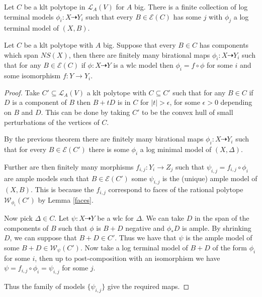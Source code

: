 	\begin{theorem}\cite[Theorem 9.34]{bhatt2020globally+}
		Let $C$ be a klt polytope in $\mathcal{L}_{A}(V)$ for $A$ big. There is a finite collection of log terminal models $\phi_{i}: X \dashrightarrow Y_{i}$ such that  every $B \in \mathcal{E}(C)$ has some $j$ with $\phi_{j}$ a log terminal model of $(X,B)$. 
	\end{theorem}
	

	
	\begin{corollary}\label{klt_finiteness}
		Let $C$ be a klt polytope with $A$ big. Suppose that every $B \in C$ has components which span $NS(X)$, then there are finitely many birational maps $\phi_{i}: X \dashrightarrow Y_{i}$ such that for any $B \in \mathcal{E}(C)$ if $\phi: X \dashrightarrow Y$ is a wlc model then $\phi_{i}=f \circ \phi$ for some $i$ and some isomorphism $f: Y \to Y_{i}$.
	\end{corollary}
	
	\begin{proof}
		
		Take $C'\subseteq \mathcal{L}_{A}(V)$ a klt polytope with $C \subseteq C'$ such that for any $B \in C$ if $D$ is a component of $B$ then $B+tD$ is in $C$ for $|t| > \epsilon$, for some $\epsilon >0$ depending on $B$ and $D$. This can be done by taking $C'$ to be the convex hull of small perturbations of the vertices of $C$.
		
		By the previous theorem there are finitely many birational maps $\phi_{i}: X \dashrightarrow Y_{i}$ such that for every $B \in \mathcal{E}(C')$ there is some $\phi_{i}$ a log minimal model of $(X,\Delta)$.
		
		Further are then finitely many morphisms $f_{i,j}:Y_{i}\to Z_{j}$ such that $\psi_{i,j}=f_{i,j} \circ \phi_{i}$ are ample models such that $B \in \mathcal{E}(C')$ some $\psi_{i,j}$ is the (unique) ample model of $(X,B)$. This is because the $f_{i,j}$ correspond to faces of the rational polytope $\mathcal{W}_{\phi_{i}}(C')$ by Lemma \ref{faces}.
		
		Now pick $\Delta \in C$. Let $\psi: X \dashrightarrow Y$ be a wlc for $\Delta$. We can take $D$ in the span of the components of $B$ such that $\phi$ is $B+D$ negative and $\phi_{*}D$ is ample. By shrinking $D$, we can suppose that $B+D\in C'$. Thus we have that $\psi$ is the ample model of some $B+D \in \mathcal{W}_{\psi}(C')$. Now take a log terminal model of $B+D$ of the form $\phi_{i}$ for some $i$, then up to post-composition with an isomorphism we have $\psi=f_{i,j} \circ \phi_{i}=\psi_{i,j}$ for some $j$. 
		
		Thus the family of models $\{\psi_{i,j}\}$ give the required maps.
		
	\end{proof}



